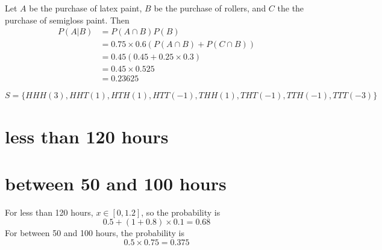 \documentclass[answers]{exam}
\begin{document}
\begin{questions}
\begin{solution}
	Let $A$ be the purchase of latex paint, $B$ be the purchase of rollers, and $C$ the the purchase of semigloss paint. Then
	\begin{align*}
		P(A|B) &= P(A\cap B)P(B) \\
		       &= 0.75\times0.6(P(A\cap B) + P(C\cap B)) \\
		       &= 0.45(0.45 + 0.25\times0.3) \\
		       &= 0.45\times0.525 \\
		       &= 0.23625
	\end{align*}
\end{solution}


\begin{solution}
	$$S = \{HHH(3), HHT(1), HTH(1), HTT(-1), THH(1), THT(-1), TTH(-1), TTT(-3)\}$$
\end{solution}


\begin{parts}
\part{less than 120 hours}
\part{between 50 and 100 hours}
\end{parts}

\begin{solution}
	For less than 120 hours, $x \in [0,1.2]$, so the probability is
	$$0.5 + (1+0.8)\times0.1 = 0.68$$
	For between 50 and 100 hours, the probability is
	$$0.5\times0.75 = 0.375$$
\end{solution}


\end{questions}
\end{document}

